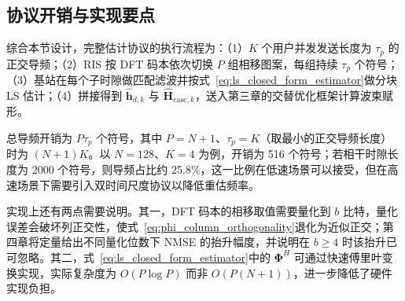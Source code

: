 \subsection{协议开销与实现要点}
\label{sec:protocol_overhead}

综合本节设计，完整估计协议的执行流程为：（1）$K$ 个用户并发发送长度为 $\tau_p$ 的正交导频；（2）RIS 按 DFT 码本依次切换 $P$ 组相移图案，每组持续 $\tau_p$ 个符号；（3）基站在每个子时隙做匹配滤波并按式~\eqref{eq:ls_closed_form_estimator}做分块 LS 估计；（4）拼接得到 $\hat{\bm{h}}_{d,k}$ 与 $\hat{\bm{H}}_{\mathrm{casc},k}$，送入第三章的交替优化框架计算波束赋形。

总导频开销为 $P\tau_p$ 个符号，其中 $P = N+1$、$\tau_p = K$（取最小的正交导频长度）时为 $(N+1)K$。以 $N = 128$、$K = 4$ 为例，开销为 516 个符号；若相干时隙长度为 2000 个符号，则导频占比约 25.8\%，这一比例在低速场景可以接受，但在高速场景下需要引入双时间尺度协议以降低重估频率。

实现上还有两点需要说明。其一，DFT 码本的相移取值需要量化到 $b$ 比特，量化误差会破坏列正交性，使式~\eqref{eq:phi_column_orthogonality}退化为近似正交；第四章将定量给出不同量化位数下 NMSE 的抬升幅度，并说明在 $b \ge 4$ 时该抬升已可忽略。其二，式~\eqref{eq:ls_closed_form_estimator}中的 $\bm{\Phi}^H$ 可通过快速傅里叶变换实现，实际复杂度为 $O(P\log P)$ 而非 $O(P(N+1))$，进一步降低了硬件实现负担。
